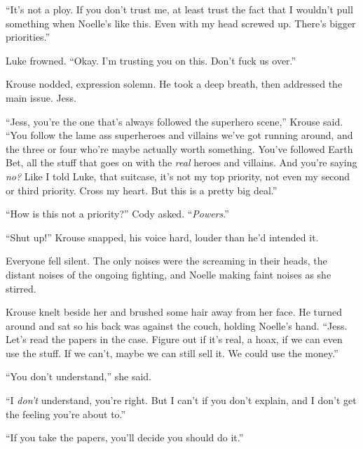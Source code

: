 ``It's not a ploy.  If you don't trust me, at least trust the fact that I wouldn't pull something when Noelle's like this.  Even with my head screwed up.  There's bigger priorities.''



Luke frowned.  ``Okay.  I'm trusting you on this.  Don't fuck us over.''



Krouse nodded, expression solemn.  He took a deep breath, then addressed the main issue.  Jess.



``Jess, you're the one that's always followed the superhero scene,'' Krouse said.  ``You follow the lame ass superheroes and villains we've got running around, and the three or four who're maybe actually worth something. You've followed Earth Bet, all the stuff that goes on with the \emph{real} heroes and villains.  And you're saying \emph{no?}  Like I told Luke, that suitcase, it's not my top priority, not even my second or third priority.  Cross my heart.  But this is a pretty big deal.''



``How is this not a priority?'' Cody asked.  ``\emph{Powers}.''



``Shut up!''  Krouse snapped, his voice hard, louder than he'd intended it.



Everyone fell silent.  The only noises were the screaming in their heads, the distant noises of the ongoing fighting, and Noelle making faint noises as she stirred.



Krouse knelt beside her and brushed some hair away from her face.  He turned around and sat so his back was against the couch, holding Noelle's hand.  ``Jess.  Let's read the papers in the case.  Figure out if it's real, a hoax, if we can even use the stuff.  If we can't, maybe we can still sell it.  We could use the money.''



``You don't understand,'' she said.



``I \emph{don't} understand, you're right.  But I can't if you don't explain, and I don't get the feeling you're about to.''



``If you take the papers, you'll decide you should do it.''



